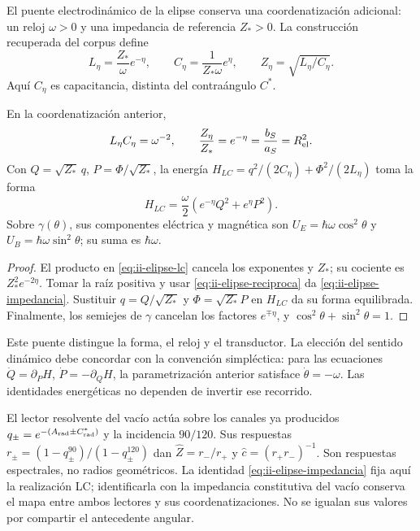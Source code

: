 El puente electrodinámico de la elipse conserva una coordenatización adicional:
un reloj \(\omega>0\) y una impedancia de referencia \(Z_*>0\).
La construcción recuperada del corpus define
\begin{equation}
 L_\eta=\frac{Z_*}{\omega}e^{-\eta},\qquad
 C_\eta=\frac{1}{Z_*\omega}e^\eta,
 \qquad Z_\eta=\sqrt{L_\eta/C_\eta}.
 \label{eq:ii-elipse-lc}
\end{equation}
Aquí \(C_\eta\) es capacitancia, distinta del contraángulo \(C^*\).
\begin{proposition}
\label{prop:ii-elipse-lc}
En la coordenatización anterior,
\begin{equation}
 L_\eta C_\eta=\omega^{-2},\qquad
 \frac{Z_\eta}{Z_*}=e^{-\eta}
 =\frac{b_S}{a_S}=R_{\rm el}^{2}.
 \label{eq:ii-elipse-impedancia}
\end{equation}
Con \(Q=\sqrt{Z_*}\,q\), \(P=\Phi/\sqrt{Z_*}\), la energía
\(H_{LC}=q^2/(2C_\eta)+\Phi^2/(2L_\eta)\) toma la forma
\[
 H_{LC}=\frac\omega2(e^{-\eta}Q^2+e^\eta P^2).
\]
Sobre \(\gamma(\theta)\), sus componentes eléctrica y magnética son
\(U_E=\hbar\omega\cos^2\theta\) y
\(U_B=\hbar\omega\sin^2\theta\); su suma es \(\hbar\omega\).
\end{proposition}
\begin{proof}
El producto en \eqref{eq:ii-elipse-lc} cancela los exponentes y
\(Z_*\); su cociente es \(Z_*^2e^{-2\eta}\). Tomar la raíz
positiva y usar \eqref{eq:ii-elipse-reciproca} da
\eqref{eq:ii-elipse-impedancia}. Sustituir \(q=Q/\sqrt{Z_*}\)
y \(\Phi=\sqrt{Z_*}P\) en \(H_{LC}\) da su forma equilibrada.
Finalmente, los semiejes de \(\gamma\) cancelan los factores
\(e^{\mp\eta}\), y \(\cos^2\theta+\sin^2\theta=1\).
\end{proof}

Este puente distingue la forma, el reloj y el transductor. La elección
del sentido dinámico debe concordar con la convención simpléctica: para
las ecuaciones \(\dot Q=\partial_PH\),
\(\dot P=-\partial_QH\), la parametrización anterior satisface
\(\dot\theta=-\omega\). Las identidades energéticas no dependen
de invertir ese recorrido.

El lector resolvente del vacío actúa sobre los canales ya producidos
\(q_\pm=e^{-(A_{\rm rad}\pm C^*_{\rm rad})}\) y la incidencia
\(90/120\). Sus respuestas
\(r_\pm=(1-q_\pm^{90})/(1-q_\pm^{120})\) dan
\(\widehat Z=r_-/r_+\) y \(\widehat c=(r_+r_-)^{-1}\).
Son respuestas espectrales, no radios geométricos. La identidad
\eqref{eq:ii-elipse-impedancia} fija aquí la realización LC;
identificarla con la impedancia constitutiva del vacío conserva el mapa
entre ambos lectores y sus coordenatizaciones. No se igualan sus valores por compartir
el antecedente angular.
